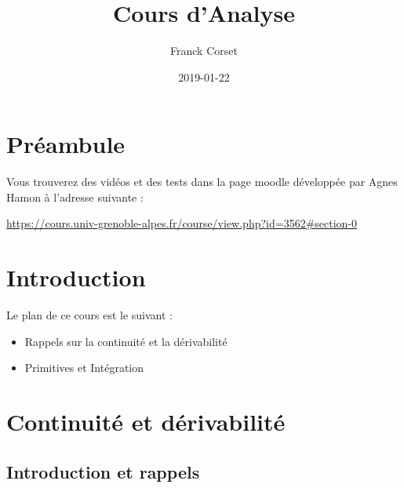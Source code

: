 \documentclass[]{book}
\title{Cours d'Analyse}
\author{Franck Corset}
\date{2019-01-22}
\theoremstyle{definition}
\theoremstyle{definition}
\theoremstyle{definition}
\theoremstyle{remark}
\begin{document}
\maketitle

{
\setcounter{tocdepth}{1}
\tableofcontents
}
\hypertarget{preambule}{%
\chapter{Préambule}\label{preambule}}

Vous trouverez des vidéos et des tests dans la page moodle développée par Agnes Hamon à l'adresse suivante :

\url{https://cours.univ-grenoble-alpes.fr/course/view.php?id=3562\#section-0}

\hypertarget{intro}{%
\chapter{Introduction}\label{intro}}

Le plan de ce cours est le suivant :

\begin{itemize}
\item
  Rappels sur la continuité et la dérivabilité
\item
  Primitives et Intégration
\end{itemize}

\hypertarget{continuite-et-derivabilite}{%
\chapter{Continuité et dérivabilité}\label{continuite-et-derivabilite}}

\hypertarget{introduction-et-rappels}{%
\section{Introduction et rappels}\label{introduction-et-rappels}}
\end{document}
